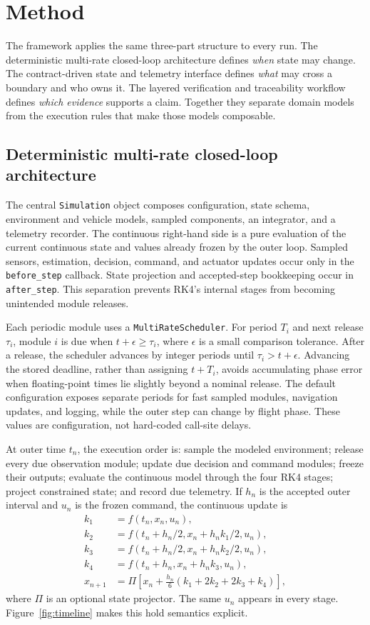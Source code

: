 \documentclass[11pt,a4paper]{article}
\newcommand{\code}[1]{\texttt{#1}}
\begin{document}
\section{Method}
The framework applies the same three-part structure to every run. The deterministic multi-rate closed-loop architecture defines \emph{when} state may change. The contract-driven state and telemetry interface defines \emph{what} may cross a boundary and who owns it. The layered verification and traceability workflow defines \emph{which evidence} supports a claim. Together they separate domain models from the execution rules that make those models composable.

\subsection{Deterministic multi-rate closed-loop architecture}
\label{sec:multirate}
The central \code{Simulation} object composes configuration, state schema, environment and vehicle models, sampled components, an integrator, and a telemetry recorder. The continuous right-hand side is a pure evaluation of the current continuous state and values already frozen by the outer loop. Sampled sensors, estimation, decision, command, and actuator updates occur only in the \code{before\_step} callback. State projection and accepted-step bookkeeping occur in \code{after\_step}. This separation prevents RK4's internal stages from becoming unintended module releases.

Each periodic module uses a \code{MultiRateScheduler}. For period $T_i$ and next release $\tau_i$, module $i$ is due when $t+\epsilon \geq \tau_i$, where $\epsilon$ is a small comparison tolerance. After a release, the scheduler advances by integer periods until $\tau_i>t+\epsilon$. Advancing the stored deadline, rather than assigning $t+T_i$, avoids accumulating phase error when floating-point times lie slightly beyond a nominal release. The default configuration exposes separate periods for fast sampled modules, navigation updates, and logging, while the outer step can change by flight phase. These values are configuration, not hard-coded call-site delays.

At outer time $t_n$, the execution order is: sample the modeled environment; release every due observation module; update due decision and command modules; freeze their outputs; evaluate the continuous model through the four RK4 stages; project constrained state; and record due telemetry. If $h_n$ is the accepted outer interval and $u_n$ is the frozen command, the continuous update is
\begin{align}
k_1 &= f(t_n,x_n,u_n),\\
k_2 &= f(t_n+h_n/2,x_n+h_nk_1/2,u_n),\\
k_3 &= f(t_n+h_n/2,x_n+h_nk_2/2,u_n),\\
k_4 &= f(t_n+h_n,x_n+h_nk_3,u_n),\\
x_{n+1} &= \Pi\!\left[x_n+\frac{h_n}{6}(k_1+2k_2+2k_3+k_4)\right],
\end{align}
where $\Pi$ is an optional state projector. The same $u_n$ appears in every stage. Figure~\ref{fig:timeline} makes this hold semantics explicit.
\end{document}
